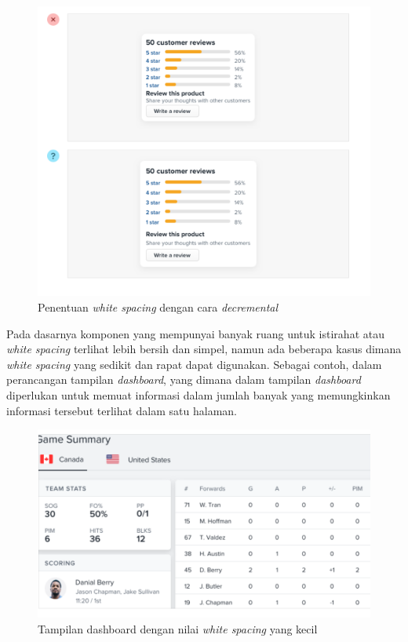 \begin{figure}[H]
	\centering
	\includegraphics[keepaspectratio, width=12cm]{gambar/refactoring-ui-g1.png}
	\caption{Penentuan \textit{white spacing} dengan cara \textit{decremental} \citep{refactoringui}}
	\label{gambar:refactoring-ui-g1.png}
\end{figure}

Pada dasarnya komponen yang mempunyai banyak ruang untuk istirahat atau \textit{white spacing} terlihat lebih bersih dan simpel, namun ada beberapa kasus dimana \textit{white spacing} yang sedikit dan rapat dapat digunakan. Sebagai contoh, dalam perancangan tampilan \textit{dashboard}, yang dimana dalam tampilan \textit{dashboard} diperlukan untuk memuat informasi dalam jumlah banyak yang memungkinkan informasi tersebut terlihat dalam satu halaman.

\begin{figure}[H]
	\centering
	\includegraphics[keepaspectratio, width=12cm]{gambar/refactoring-ui-g2.png}
	\caption{Tampilan dashboard dengan nilai \emph{white spacing} yang kecil \citep{refactoringui}}
	\label{gambar:refactoring-ui-g2.png}
\end{figure}

